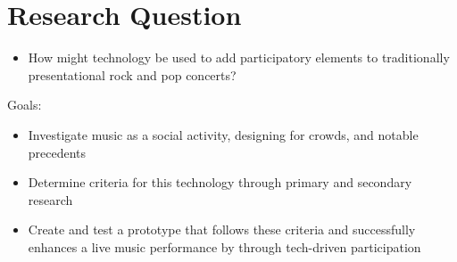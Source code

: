 

\section{Research Question}

\begin{itemize}
	\item How might technology be used to add participatory elements to traditionally presentational rock and pop concerts?
\end{itemize}

Goals:
\begin{itemize}
	\item Investigate music as a social activity, designing for crowds, and notable precedents
	\item Determine criteria for this technology through primary and secondary research
	\item Create and test a prototype that follows these criteria and successfully enhances a live music performance by through tech-driven participation
\end{itemize}

